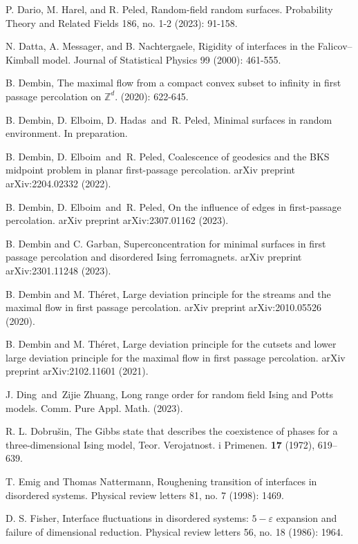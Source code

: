 \documentclass[11pt, reqno]{amsart}
\numberwithin{equation}{section}
\begin{document}
\begin{thebibliography}{}
P. Dario, M. Harel, and R. Peled, Random-field random surfaces. Probability Theory and Related Fields 186, no. 1-2 (2023): 91-158.

N. Datta, A. Messager, and B. Nachtergaele, Rigidity of interfaces in the Falicov–Kimball model. Journal of Statistical Physics 99 (2000): 461-555.

B. Dembin, The maximal flow from a compact convex subset to infinity in first passage percolation on $\mathbb{Z}^d$. (2020): 622-645.

 B. Dembin, D. Elboim, D. Hadas\ and\ R. Peled, Minimal surfaces in random environment. In preparation.

 B. Dembin, D. Elboim\ and\ R. Peled, Coalescence of geodesics and the BKS midpoint problem in planar first-passage percolation. arXiv preprint arXiv:2204.02332 (2022).

 B. Dembin, D. Elboim\ and\ R. Peled, On the influence of edges in first-passage percolation. arXiv preprint arXiv:2307.01162 (2023).

B. Dembin and C. Garban, Superconcentration for minimal surfaces in first passage percolation and disordered Ising ferromagnets. arXiv preprint arXiv:2301.11248 (2023).

B. Dembin and M. Th\'eret, Large deviation principle for the streams and the maximal flow in first passage percolation. arXiv preprint arXiv:2010.05526 (2020).

B. Dembin and M. Th\'eret, Large deviation principle for the cutsets and lower large deviation principle for the maximal flow in first passage percolation. arXiv preprint arXiv:2102.11601 (2021).

J. Ding\ and\ Zijie Zhuang, Long range order for random field Ising and Potts models. Comm. Pure Appl. Math. (2023).

R. L. Dobru\v{s}in, The Gibbs state that describes the coexistence of phases for a three-dimensional Ising model, Teor. Verojatnost. i Primenen. {\bf 17} (1972), 619--639. 


T. Emig and Thomas Nattermann, Roughening transition of interfaces in disordered systems. Physical review letters 81, no. 7 (1998): 1469.

D. S. Fisher,  Interface fluctuations in disordered systems: $5-\varepsilon$ expansion and failure of dimensional reduction. Physical review letters 56, no. 18 (1986): 1964.


\end{thebibliography}
\end{document}
